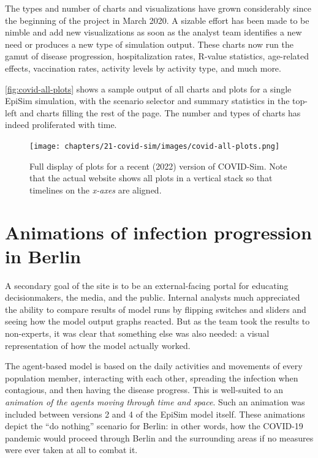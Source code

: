 The types and number of charts and visualizations have grown considerably since the beginning of the project in March 2020. A sizable effort has been made to be nimble and add new visualizations as soon as the analyst team identifies a new need or produces a new type of simulation output. These charts now run the gamut of disease progression, hospitalization rates, R-value statistics, age-related effects, vaccination rates, activity levels by activity type, and much more.

\autoref{fig:covid-all-plots} shows a sample output of all charts and plots for a single EpiSim simulation, with the scenario selector and summary statistics in the top-left and charts filling the rest of the page. The number and types of charts has indeed proliferated with time.

\begin{figure}
  \centering
	\begin{minipage}{\textwidth}
    \centering
    \texttt{[image: chapters/21-covid-sim/images/covid-all-plots.png]}
  \caption{Full display of plots for a recent (2022) version of COVID-Sim. Note that the actual website shows all plots in a vertical stack so that timelines on the \emph{x-axes} are aligned.}
  \label{fig:covid-all-plots}
	\end{minipage}
\end{figure}


\hypertarget{covid-animations-of-infection-progression-in-berlin}{%
\section{Animations of infection progression in Berlin}\label{animations-of-infection-progression-in-berlin}}

A secondary goal of the site is to be an external-facing portal for educating decisionmakers, the media, and the public. Internal analysts much appreciated the ability to compare results of model runs by flipping switches and sliders and seeing how the model output graphs reacted. But as the team took the results to non-experts, it was clear that something else was also needed: a visual representation of how the model actually worked.

The agent-based model is based on the daily activities and movements of every population member, interacting with each other, spreading the infection when contagious, and then having the disease progress. This is well-suited to an \emph{animation of the agents moving through time and space}. Such an animation was included between versions 2 and 4 of the EpiSim model itself. These animations depict the ``do nothing'' scenario for Berlin: in other words, how the COVID-19 pandemic would proceed through Berlin and the surrounding areas if no measures were ever taken at all to combat it.


